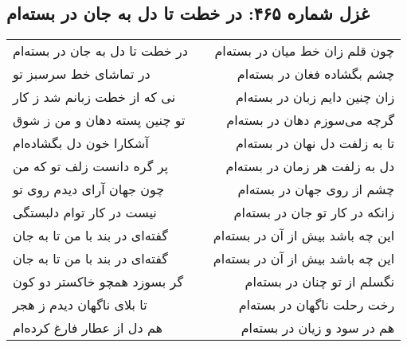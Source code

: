 \begin{center}
\section*{غزل شماره ۴۶۵: در خطت تا دل به جان در بسته‌ام}
\label{sec:465}
\begin{longtable}{l p{0.5cm} r}
در خطت تا دل به جان در بسته‌ام
&&
چون قلم زان خط میان در بسته‌ام
\\
در تماشای خط سرسبز تو
&&
چشم بگشاده فغان در بسته‌ام
\\
نی که از خطت زبانم شد ز کار
&&
زان چنین دایم زبان در بسته‌ام
\\
تو چنین پسته دهان و من ز شوق
&&
گرچه می‌سوزم دهان در بسته‌ام
\\
آشکارا خون دل بگشاده‌ام
&&
تا به زلفت دل نهان در بسته‌ام
\\
پر گره دانست زلف تو که من
&&
دل به زلفت هر زمان در بسته‌ام
\\
چون جهان آرای دیدم روی تو
&&
چشم از روی جهان در بسته‌ام
\\
نیست در کار توام دلبستگی
&&
زانکه در کار تو جان در بسته‌ام
\\
گفته‌ای در بند با من تا به جان
&&
این چه باشد بیش از آن در بسته‌ام
\\
گفته‌ای در بند با من تا به جان
&&
این چه باشد بیش از آن در بسته‌ام
\\
گر بسوزد همچو خاکستر دو کون
&&
نگسلم از تو چنان در بسته‌ام
\\
تا بلای ناگهان دیدم ز هجر
&&
رخت رحلت ناگهان در بسته‌ام
\\
هم دل از عطار فارغ کرده‌ام
&&
هم در سود و زیان در بسته‌ام
\\
\end{longtable}
\end{center}
